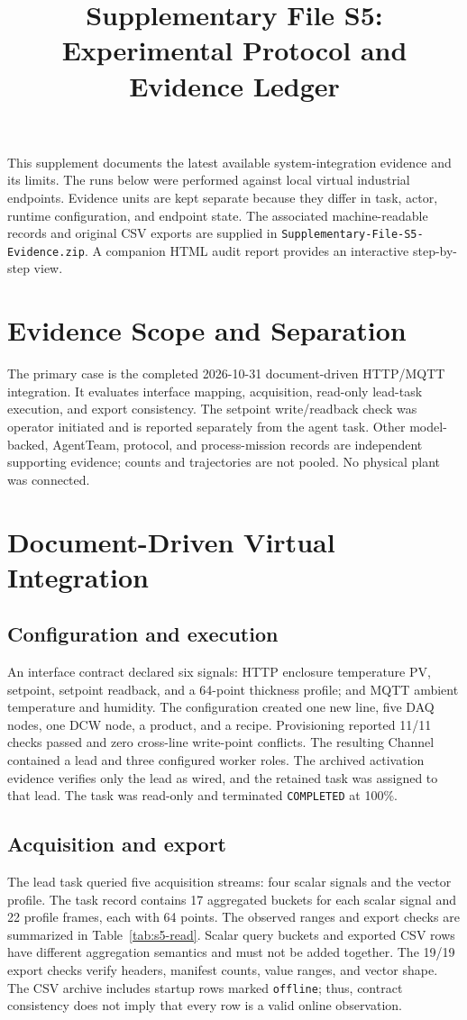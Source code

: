 \documentclass[journal]{IEEEtran}
\title{Supplementary File S5: Experimental Protocol and Evidence Ledger}
\author{}
\begin{document}
\maketitle

\noindent This supplement documents the latest available system-integration
evidence and its limits. The runs below were performed against local virtual
industrial endpoints. Evidence units are kept separate because they differ in
task, actor, runtime configuration, and endpoint state. The associated
machine-readable records and original CSV exports are supplied in
\texttt{Supplementary-File-S5-Evidence.zip}. A companion HTML audit report
provides an interactive step-by-step view.

\section{Evidence Scope and Separation}
The primary case is the completed 2026-10-31 document-driven HTTP/MQTT
integration. It evaluates interface mapping, acquisition, read-only lead-task
execution, and export consistency. The setpoint write/readback check was
operator initiated and is reported separately from the agent task. Other
model-backed, AgentTeam, protocol, and process-mission records are independent
supporting evidence; counts and trajectories are not pooled. No physical plant
was connected.

\section{Document-Driven Virtual Integration}
\subsection{Configuration and execution}
An interface contract declared six signals: HTTP enclosure temperature PV,
setpoint, setpoint readback, and a 64-point thickness profile; and MQTT
ambient temperature and humidity. The configuration created one new line,
five DAQ nodes, one DCW node, a product, and a recipe. Provisioning reported
11/11 checks passed and zero cross-line write-point conflicts. The resulting
Channel contained a lead and three configured worker roles. The archived
activation evidence verifies only the lead as wired, and the retained task
was assigned to that lead. The task was read-only and terminated
\texttt{COMPLETED} at 100\%.

\subsection{Acquisition and export}
The lead task queried five acquisition streams: four scalar signals and the
vector profile. The task record contains 17 aggregated buckets for each scalar
signal and 22 profile frames, each with 64 points. The observed ranges and
export checks are summarized in Table~\ref{tab:s5-read}. Scalar query buckets
and exported CSV rows have different aggregation semantics and must not be
added together. The 19/19 export checks verify headers, manifest counts, value
ranges, and vector shape. The CSV archive includes startup rows marked
\texttt{offline}; thus, contract consistency does not imply that every row is
a valid online observation.
\end{document}
